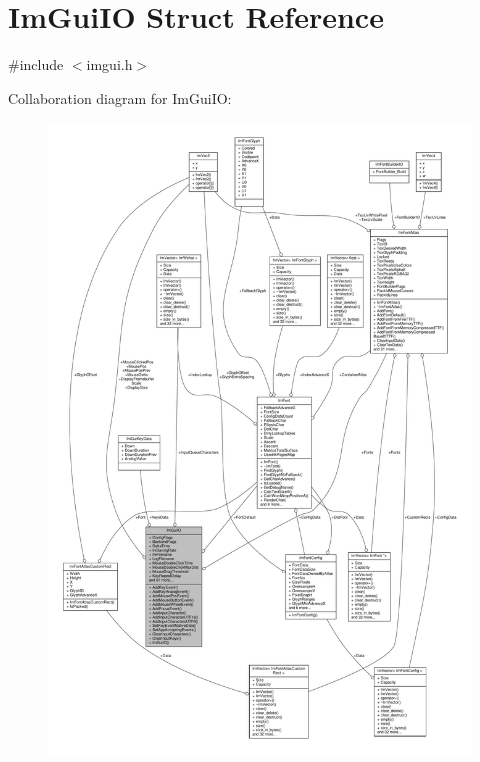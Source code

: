 \hypertarget{structImGuiIO}{}\section{Im\+Gui\+IO Struct Reference}
\label{structImGuiIO}


{\ttfamily \#include $<$imgui.\+h$>$}



Collaboration diagram for Im\+Gui\+IO\+:
\nopagebreak
\begin{figure}[H]
\begin{center}
\leavevmode
\includegraphics[width=350pt]{structImGuiIO__coll__graph}
\end{center}
\end{figure}
